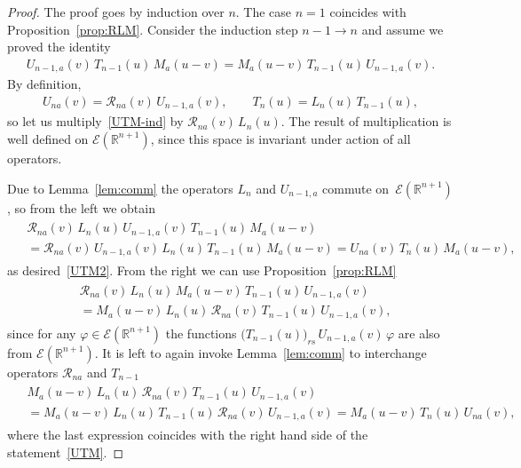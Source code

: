\documentclass[11pt]{article}
\numberwithin{equation}{section}
\theoremstyle{plain}
\theoremstyle{definition}
\renewcommand{\phi}{\varphi}
\begin{document}
\begin{proof}
	The proof goes by induction over $n$. The case $n = 1$ coincides with Proposition~\ref{prop:RLM}. Consider the induction step $n - 1 \to n$ and assume we proved the identity
	\begin{align}\label{UTM-ind}
		U_{n-1 , a}(v) \, T_{n - 1}(u) \, M_a(u - v) = M_a(u - v) \, T_{n - 1}(u) \, U_{n-1 , a}(v).
	\end{align}
	By definition,
	\begin{align}
		U_{na}(v) = \mathcal{R}_{na}(v) \, U_{n - 1 , a}(v), \qquad T_n(u) = L_n(u) \, T_{n - 1}(u),
	\end{align}
	so let us multiply~\eqref{UTM-ind} by $\mathcal{R}_{na}(v) \, L_n(u)$. The result of multiplication is well defined on $\mathcal{E}(\mathbb{R}^{n + 1})$, since this space is invariant under action of all operators. 
	
	Due to Lemma~\ref{lem:comm} the operators $L_n$ and $U_{n - 1 , a}$ commute on~$\mathcal{E}(\mathbb{R}^{n + 1})$, so from the left we obtain
	\begin{align}
		\begin{aligned}
			& \mathcal{R}_{na}(v) \, L_n(u) \, U_{n-1 , a}(v) \, T_{n - 1}(u) \, M_a(u - v) \\[6pt]
			&  = \mathcal{R}_{na}(v) \, U_{n-1 , a}(v) \, L_n(u)  \, T_{n - 1}(u) \, M_a(u - v) = U_{na}(v) \, T_n(u) \, M_a(u - v),
		\end{aligned}
	\end{align}
	as desired~\eqref{UTM2}. From the right we can use Proposition~\ref{prop:RLM}
	\begin{align}
		\begin{aligned}
			& \mathcal{R}_{na}(v) \, L_n(u) \, M_a(u - v) \, T_{n - 1}(u) \, U_{n-1 , a}(v) \\[6pt]
			&  =  M_a(u - v) \, L_n(u) \, \mathcal{R}_{na}(v) \, T_{n - 1}(u) \, U_{n-1 , a}(v),
		\end{aligned}
	\end{align}
	since for any $\phi \in \mathcal{E}(\mathbb{R}^{n + 1})$ the functions $\bigl( T_{n - 1}(u) \bigr)_{rs} \, U_{n-1 , a}(v) \, \phi$ are also from $\mathcal{E}(\mathbb{R}^{n + 1})$. It is left to again invoke Lemma~\ref{lem:comm} to interchange operators $\mathcal{R}_{na}$ and $T_{n - 1}$
	\begin{align}
		\begin{aligned}
			& M_a(u - v) \, L_n(u) \, \mathcal{R}_{na}(v) \, T_{n - 1}(u) \, U_{n-1 , a}(v) \\[6pt]
			&  = M_a(u - v) \, L_n(u) \, T_{n - 1}(u) \, \mathcal{R}_{na}(v) \, U_{n-1 , a}(v) = M_a(u - v) \, T_n(u) \, U_{na}(v),
		\end{aligned}
	\end{align}
	where the last expression coincides with the right hand side of the statement~\eqref{UTM}.
\end{proof}
\end{document}
